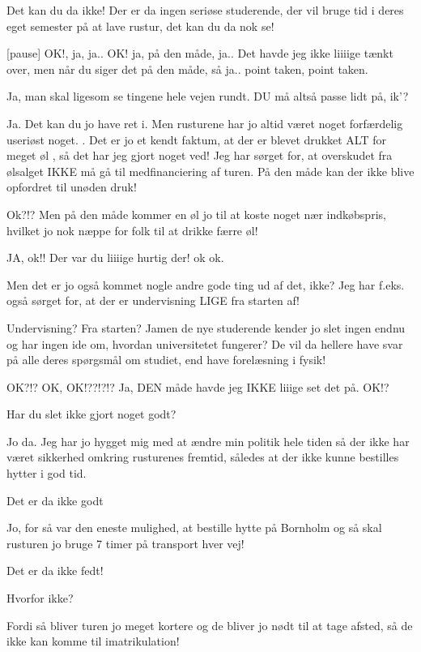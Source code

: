 \documentclass[danish]{article}
\begin{document}
\begin{sketch}
 Det kan du da ikke! Der er da ingen seriøse studerende, der vil
bruge tid i deres eget semester på at lave rustur, det kan du da nok se!

[pause] OK!, ja, ja.. OK! ja, på den måde, ja.. Det havde jeg ikke
liiiige tænkt over, men når du siger det på den måde, så ja.. point
taken, point taken.

 Ja, man skal ligesom se tingene hele vejen rundt.  DU
må altså passe lidt på, ik'?

 Ja. Det kan du jo have ret i. Men rusturene har jo altid været noget
forfærdelig useriøst noget. . Det er jo et kendt faktum, at der
er blevet drukket ALT for meget øl , så det har jeg gjort
noget ved! Jeg har sørget for, at overskudet fra ølsalget IKKE må gå til
medfinanciering af turen. På den måde kan der ikke blive opfordret til unøden
druk!

 Ok?!? Men på den måde kommer en øl jo til at koste noget nær
indkøbspris, hvilket jo nok næppe for folk til at drikke færre øl!

 JA, ok!! Der var du liiiige hurtig der! ok ok.

 Men det er jo også kommet nogle andre gode ting ud af det, ikke? Jeg
har f.eks. også sørget for, at der er undervisning LIGE fra starten af!

 Undervisning? Fra starten? Jamen de nye studerende kender jo slet
ingen endnu og har ingen ide om, hvordan universitetet fungerer? De vil
da hellere have svar på alle deres spørgsmål om studiet, end have
forelæsning i fysik!

 OK?!? OK, OK!??!?!? Ja, DEN måde havde jeg IKKE liiige set det på. OK!?

 Har du slet ikke gjort noget godt?

 Jo da. Jeg har jo hygget mig med at ændre min politik hele tiden så
der ikke har været sikkerhed omkring rusturenes fremtid, således at
der ikke kunne bestilles hytter i god tid.

 Det er da ikke godt

 Jo, for så var den eneste mulighed, at bestille hytte på Bornholm
og så skal rusturen jo bruge 7 timer på transport hver vej!

 Det er da ikke fedt!

 Hvorfor ikke?

 Fordi så bliver turen jo meget kortere og de bliver jo nødt til at
tage afsted, så de ikke kan komme til imatrikulation!


\end{sketch}
\end{document}
